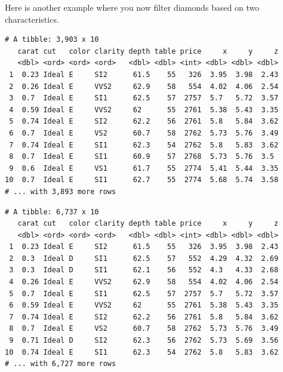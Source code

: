\documentclass[
]{book}
\newenvironment{Shaded}{\begin{snugshade}}{\end{snugshade}}
\newcommand{\KeywordTok}[1]{\textcolor[rgb]{0.13,0.29,0.53}{\textbf{#1}}}
\newcommand{\NormalTok}[1]{#1}
\newcommand{\OperatorTok}[1]{\textcolor[rgb]{0.81,0.36,0.00}{\textbf{#1}}}
\newcommand{\StringTok}[1]{\textcolor[rgb]{0.31,0.60,0.02}{#1}}
\begin{document}
Here is another example where you now filter diamonds based on two characteristics.

\begin{Shaded}
\end{Shaded}

\begin{verbatim}
# A tibble: 3,903 x 10
   carat cut   color clarity depth table price     x     y     z
   <dbl> <ord> <ord> <ord>   <dbl> <dbl> <int> <dbl> <dbl> <dbl>
 1  0.23 Ideal E     SI2      61.5    55   326  3.95  3.98  2.43
 2  0.26 Ideal E     VVS2     62.9    58   554  4.02  4.06  2.54
 3  0.7  Ideal E     SI1      62.5    57  2757  5.7   5.72  3.57
 4  0.59 Ideal E     VVS2     62      55  2761  5.38  5.43  3.35
 5  0.74 Ideal E     SI2      62.2    56  2761  5.8   5.84  3.62
 6  0.7  Ideal E     VS2      60.7    58  2762  5.73  5.76  3.49
 7  0.74 Ideal E     SI1      62.3    54  2762  5.8   5.83  3.62
 8  0.7  Ideal E     SI1      60.9    57  2768  5.73  5.76  3.5 
 9  0.6  Ideal E     VS1      61.7    55  2774  5.41  5.44  3.35
10  0.7  Ideal E     SI1      62.7    55  2774  5.68  5.74  3.58
# ... with 3,893 more rows
\end{verbatim}

\begin{Shaded}
\end{Shaded}

\begin{verbatim}
# A tibble: 6,737 x 10
   carat cut   color clarity depth table price     x     y     z
   <dbl> <ord> <ord> <ord>   <dbl> <dbl> <int> <dbl> <dbl> <dbl>
 1  0.23 Ideal E     SI2      61.5    55   326  3.95  3.98  2.43
 2  0.3  Ideal D     SI1      62.5    57   552  4.29  4.32  2.69
 3  0.3  Ideal D     SI1      62.1    56   552  4.3   4.33  2.68
 4  0.26 Ideal E     VVS2     62.9    58   554  4.02  4.06  2.54
 5  0.7  Ideal E     SI1      62.5    57  2757  5.7   5.72  3.57
 6  0.59 Ideal E     VVS2     62      55  2761  5.38  5.43  3.35
 7  0.74 Ideal E     SI2      62.2    56  2761  5.8   5.84  3.62
 8  0.7  Ideal E     VS2      60.7    58  2762  5.73  5.76  3.49
 9  0.71 Ideal D     SI2      62.3    56  2762  5.73  5.69  3.56
10  0.74 Ideal E     SI1      62.3    54  2762  5.8   5.83  3.62
# ... with 6,727 more rows
\end{verbatim}
\end{document}

